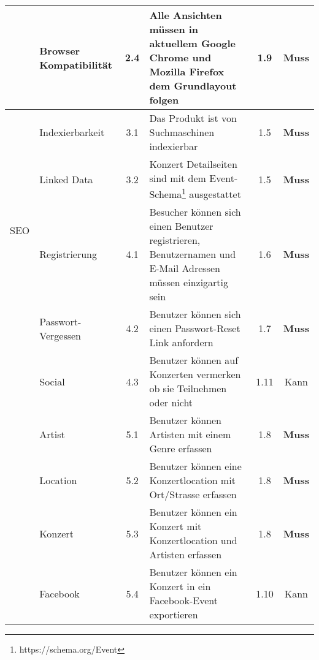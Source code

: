 \begin{longtable}[]{@{}p{1.9cm}p{2.5cm}cp{5.5cm}cc@{}}
                             & Browser Kompatibilität     & 2.4          & Alle Ansichten müssen in aktuellem Google Chrome und Mozilla Firefox dem Grundlayout folgen                 & 1.9           & \textbf{Muss}                \\
  \midrule
  \multirow{4}{*}{SEO}       & Indexierbarkeit            & 3.1          & Das Produkt ist von Suchmaschinen indexierbar                                                               & 1.5           & \textbf{Muss}                \\ \cline{2-6}
                             & Linked Data                & 3.2          & Konzert Detailseiten sind mit dem Event-Schema\footnote{https://schema.org/Event} ausgestattet              & 1.5           & \textbf{Muss}                \\
  \midrule
  \multirow{8}{*}{Benutzer}  & Registrierung              & 4.1          & Besucher können sich einen Benutzer registrieren, Benutzernamen und E-Mail Adressen müssen einzigartig sein & 1.6           & \textbf{Muss}                \\ \cline{2-6}
                             & Passwort-Vergessen         & 4.2          & Benutzer können sich einen Passwort-Reset Link anfordern                                                    & 1.7           & \textbf{Muss}                \\ \cline{2-6}
                             & Social                     & 4.3          & Benutzer können auf Konzerten vermerken ob sie Teilnehmen oder nicht                                        & 1.11          & Kann                         \\
  \midrule
  \clearpage
  \multirow{6}{*}{Erfassung} & Artist                     & 5.1          & Benutzer können Artisten mit einem Genre erfassen                                                           & 1.8           & \textbf{Muss}                \\ \cline{2-6}
                             & Location                   & 5.2          & Benutzer können eine Konzertlocation mit Ort/Strasse erfassen                                               & 1.8           & \textbf{Muss}                \\ \cline{2-6}
                             & Konzert                    & 5.3          & Benutzer können ein Konzert mit Konzertlocation und Artisten erfassen                                       & 1.8           & \textbf{Muss}                \\ \cline{2-6}
                             & Facebook                   & 5.4          & Benutzer können ein Konzert in ein Facebook-Event exportieren                                               & 1.10          & Kann                         \\

\end{longtable}
